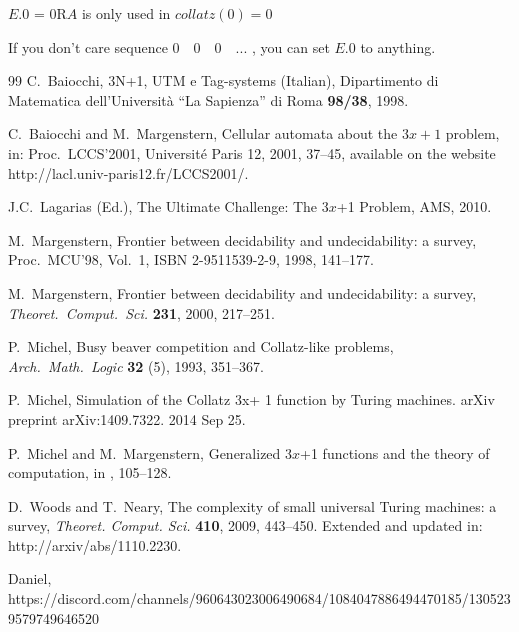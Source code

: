 \documentclass[10pt]{article}
\begin{document}
$E$.0 = 0R$A$  is only used in $collatz(0) = 0$

If you don't care sequence $0 \quad 0 \quad 0 \quad ...$ , you can set $E$.0 to anything.

\begin{thebibliography}{99}
 C.\ Baiocchi, 3N+1, UTM e Tag-systems (Italian),
Dipartimento di Matematica dell'Universit\`a ``La Sapienza'' di Roma {\bf 98/38}, 1998.

 C.\ Baiocchi and M.\ Margenstern, Cellular automata about
the $3x + 1$ problem, in: Proc.\ LCCS'2001, Universit\'e Paris 12, 2001, 37--45,
available on the website http://lacl.univ-paris12.fr/LCCS2001/.

 J.C.\ Lagarias (Ed.), The Ultimate Challenge: The 3$x$+1 Problem, AMS, 2010.

 M.\ Margenstern, Frontier between decidability and undecidability: a survey,
Proc.\ MCU'98, Vol.\ 1, ISBN 2-9511539-2-9, 1998, 141--177.

 M.\ Margenstern, Frontier between decidability and undecidability:
a survey, \emph{Theoret.\ Comput.\ Sci.} {\bf 231}, 2000, 217--251.

 P.\ Michel, Busy beaver competition and Collatz-like problems,
\emph{Arch.\ Math.\ Logic} {\bf 32} (5), 1993, 351--367.

 P.\ Michel, Simulation of the Collatz 3x+ 1 function by Turing machines. arXiv preprint arXiv:1409.7322. 2014 Sep 25.

 P.\ Michel and M.\ Margenstern, Generalized 3$x$+1 functions and the theory of computation,
in \cite{La10}, 105--128.

 D.\ Woods and T.\ Neary, The complexity of small universal Turing machines:
a survey, \emph{Theoret. Comput. Sci.} {\bf 410}, 2009, 443--450.
Extended and updated in: http://arxiv/abs/1110.2230.

 Daniel, https://discord.com/channels/960643023006490684/1084047886494470185/1305239579749646520

\end{thebibliography}
\end{document}

